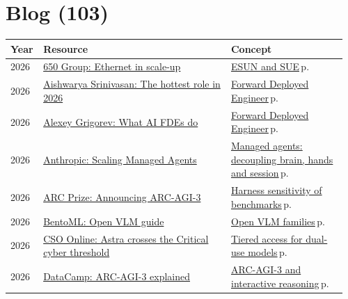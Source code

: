 \documentclass[10pt,a4paper,openany]{report}
\begin{document}
\section{Blog (103)}
{\small\begin{longtable}{@{}p{0.07\linewidth}>{\raggedright}p{0.55\linewidth}>{\raggedright\arraybackslash}p{0.34\linewidth}@{}}
\textbf{\sffamily Year} & \textbf{\sffamily Resource} & \textbf{\sffamily Concept}\\ \hline\endhead
2026 & \href{https://650group.com/blog/in-the-ai-era-ethernet-set-to-surge-in-scale-out-and-ramp-in-scale-up/}{650 Group: Ethernet in scale-up} & \hyperref[c:hardware-4]{ESUN and SUE}\,{\color{muted}\scriptsize p.\,\pageref{c:hardware-4}}\\
2026 & \href{https://aishwaryasrinivasan.substack.com/p/the-hottest-role-in-2026-forward}{Aishwarya Srinivasan: The hottest role in 2026} & \hyperref[c:practice-0]{Forward Deployed Engineer}\,{\color{muted}\scriptsize p.\,\pageref{c:practice-0}}\\
2026 & \href{https://alexeyondata.substack.com/p/what-ai-forward-deployed-engineers}{Alexey Grigorev: What AI FDEs do} & \hyperref[c:practice-0]{Forward Deployed Engineer}\,{\color{muted}\scriptsize p.\,\pageref{c:practice-0}}\\
2026 & \href{https://anthropic.com/engineering/managed-agents}{Anthropic: Scaling Managed Agents} & \hyperref[c:agents-2]{Managed agents: decoupling brain, hands and session}\,{\color{muted}\scriptsize p.\,\pageref{c:agents-2}}\\
2026 & \href{https://arcprize.org/blog/arc-agi-3-launch}{ARC Prize: Announcing ARC-AGI-3} & \hyperref[c:evals-1]{Harness sensitivity of benchmarks}\,{\color{muted}\scriptsize p.\,\pageref{c:evals-1}}\\
2026 & \href{https://www.bentoml.com/blog/multimodal-ai-a-guide-to-open-source-vision-language-models}{BentoML: Open VLM guide} & \hyperref[c:vlm-1]{Open VLM families}\,{\color{muted}\scriptsize p.\,\pageref{c:vlm-1}}\\
2026 & \href{https://www.csoonline.com/article/4218679/openai-launches-gpt-6-astra-its-first-model-to-cross-a-critical-cybersecurity-threshold.html}{CSO Online: Astra crosses the Critical cyber threshold} & \hyperref[c:landscape-2]{Tiered access for dual-use models}\,{\color{muted}\scriptsize p.\,\pageref{c:landscape-2}}\\
2026 & \href{https://www.datacamp.com/blog/arc-agi-3}{DataCamp: ARC-AGI-3 explained} & \hyperref[c:evals-4]{ARC-AGI-3 and interactive reasoning}\,{\color{muted}\scriptsize p.\,\pageref{c:evals-4}}\\

\end{longtable}}
\end{document}
